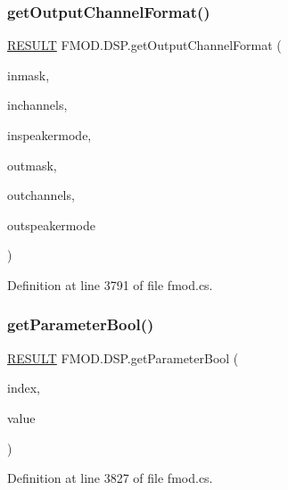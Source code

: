 \subsubsection{\texorpdfstring{get\+Output\+Channel\+Format()}{getOutputChannelFormat()}}
{\footnotesize\ttfamily \hyperlink{namespace_f_m_o_d_a305d1176ef3f8c8815861a60407ac33d}{R\+E\+S\+U\+LT} F\+M\+O\+D.\+D\+S\+P.\+get\+Output\+Channel\+Format (\begin{DoxyParamCaption}\item[{\hyperlink{namespace_f_m_o_d_ae295945ff00acb5f2e5ef0b3f217f5e2}{C\+H\+A\+N\+N\+E\+L\+M\+A\+SK}}]{inmask,  }\item[{int}]{inchannels,  }\item[{\hyperlink{namespace_f_m_o_d_aa0732e7e8efd3b96b526a7f2f8479634}{S\+P\+E\+A\+K\+E\+R\+M\+O\+DE}}]{inspeakermode,  }\item[{out \hyperlink{namespace_f_m_o_d_ae295945ff00acb5f2e5ef0b3f217f5e2}{C\+H\+A\+N\+N\+E\+L\+M\+A\+SK}}]{outmask,  }\item[{out int}]{outchannels,  }\item[{out \hyperlink{namespace_f_m_o_d_aa0732e7e8efd3b96b526a7f2f8479634}{S\+P\+E\+A\+K\+E\+R\+M\+O\+DE}}]{outspeakermode }\end{DoxyParamCaption})}



Definition at line 3791 of file fmod.\+cs.

\mbox{\label{class_f_m_o_d_1_1_d_s_p_acc04bea0fdec2a13b8c2109ab99a9f7e}} 
\subsubsection{\texorpdfstring{get\+Parameter\+Bool()}{getParameterBool()}}
{\footnotesize\ttfamily \hyperlink{namespace_f_m_o_d_a305d1176ef3f8c8815861a60407ac33d}{R\+E\+S\+U\+LT} F\+M\+O\+D.\+D\+S\+P.\+get\+Parameter\+Bool (\begin{DoxyParamCaption}\item[{int}]{index,  }\item[{out bool}]{value }\end{DoxyParamCaption})}



Definition at line 3827 of file fmod.\+cs.

